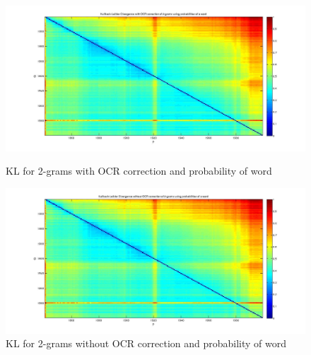 \begin{figure}[h!]
    \begin{minipage}[b]{0.48\linewidth}
        \includegraphics[scale=0.15]{Pictures/kullback-leibler/KL_2-grams_with_correction_proba.jpg}
        \caption{KL for 2-grams with OCR correction and probability of word}
        \label{}
    \end{minipage}\hfill
    \begin{minipage}[b]{0.5\linewidth}
        \includegraphics[scale=0.15]{Pictures/kullback-leibler/KL_2-grams_without_correction_proba.jpg}
        \caption{KL for 2-grams without OCR correction and probability of word}
        \label{}
    \end{minipage}\hfill
\end{figure}

